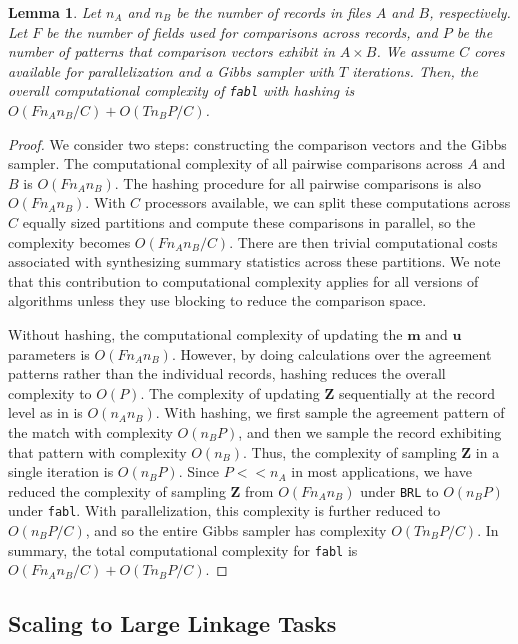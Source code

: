 \documentclass[ba]{imsart}
\newtheorem{lemma}{Lemma}
\begin{document}
\begin{lemma}
	Let $n_A$ and $n_B$ be the number of records in files $A$ and $B$, respectively. Let $F$ be the number of fields used for comparisons across records, and $P$ be the number of patterns that comparison vectors exhibit in $A \times B$. We assume $C$ cores available for parallelization and a Gibbs sampler with $T$ iterations. Then, the overall computational complexity of \texttt{fabl} with hashing is $O(F n_A n_B /C) + O(T n_B P / C)$.
	\label{lemma:fabl}
\end{lemma}
\begin{proof}
	We consider two steps: constructing the comparison vectors and the Gibbs sampler. The computational complexity of all pairwise comparisons across $A$ and $B$ is $O(F n_A n_B)$. The hashing procedure for all pairwise comparisons is also $O(F n_A n_B)$. With $C$ processors available, we can split these computations across $C$ equally sized partitions and compute these comparisons in parallel, so the complexity becomes $O(F n_A n_B /C)$. There are then trivial computational costs associated with synthesizing summary statistics across these partitions. We note that this contribution to computational complexity applies for all versions of \cite{fellegi_theory_1969} algorithms unless they use blocking to reduce the comparison space.
	
	Without hashing, the computational complexity of updating the $\bm{m}$ and $\bm{u}$ parameters is $O(F n_A n_B)$. However, by doing calculations over the agreement patterns rather than the individual records, hashing reduces the overall complexity to $O(P)$. The complexity of updating $\bm{Z}$ sequentially at the record level as in \cite{sadinle_bayesian_2017} is $O(n_A n_B)$. With hashing, we first sample the agreement pattern of the match with complexity $O(n_B P)$, and then we sample the record exhibiting that pattern with complexity $O(n_B)$. Thus, the complexity of sampling $\bm{Z}$ in a single iteration is $O(n_B P)$. Since $P << n_A$ in most applications, we have reduced the complexity of sampling $\bm{Z}$ from $O(F n_A n_B)$ under \texttt{BRL} to $O(n_B P)$ under \texttt{fabl}. With parallelization, this complexity is further reduced to $O(n_B P /C)$, and so the entire Gibbs sampler has complexity $O(T n_B P / C).$
	In summary, the total computational complexity for \texttt{fabl} is $O(F n_A n_B / C) + O(T n_B P / C).$
\end{proof} 

\hypertarget{scaling}{%
	\subsection{Scaling to Large Linkage Tasks}\label{scaling}}
\end{document}
